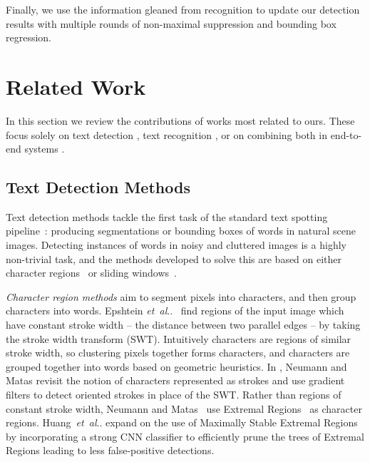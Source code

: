 \documentclass[twocolumn]{svjour3}          \smartqed  \usepackage{epsfig}
\makeatletter
\DeclareRobustCommand\onedot{\futurelet\@let@token\@onedot}
\def\@onedot{\ifx\@let@token.\else.\null\fi\xspace}
\def\etal{\emph{et~al}\onedot}
\makeatother
\begin{document}
Finally, we use the information gleaned from recognition to update our detection results with multiple rounds of non-maximal suppression and bounding box regression. 



\section{Related Work}
\label{sec:related}
In this section we review the contributions of works most related to ours. These focus solely on text detection \cite{Anthimopoulos11, Chen11a,Epshtein10,Yi11,Yin13,Huang14}, text recognition \cite{Mishra12,Novikova12,Rath07,Bissacco13,Jaderberg14c,Almazan14,Yao14}, or on combining both in end-to-end
systems \cite{QuackText09,Posner10,Wang12,NeumannText10, Neumann11,Neumann12,Wang11,Neumann13,Alsharif13,Weinman13,Jaderberg14a,Gordo14,Mishra13}.

\subsection{Text Detection Methods}
Text detection methods tackle the first task of the standard text spotting pipeline~\cite{Chen04text}: producing segmentations or bounding boxes of words in natural scene images. Detecting instances of words in noisy and cluttered images is a highly non-trivial task, and the methods developed to solve this are based on either character regions~\cite{Chen11a,Epshtein10,Yi11,Yin13,NeumannText10, Neumann11,Neumann12,Neumann13,Huang14} or sliding windows~\cite{Jaderberg14a,QuackText09,Anthimopoulos11,Posner10,Wang11,Wang12}.

\emph{Character region methods} aim to segment pixels into characters, and then group characters into words. Epshtein \etal~\cite{Epshtein10} find regions of the input image which have constant stroke width -- the distance between two parallel edges -- by taking the stroke width transform (SWT). Intuitively characters are regions of similar stroke width, so clustering pixels together forms characters, and characters are grouped together into words based on geometric heuristics. In \cite{Neumann13}, Neumann and Matas revisit the notion of characters represented as strokes and use gradient filters to detect oriented strokes in place of the SWT. Rather than regions of constant stroke width, Neumann and Matas~\citep{Neumann11,NeumannText10,Neumann12} use Extremal Regions~\cite{Matas02} as character regions. Huang~\etal \cite{Huang14} expand on the use of Maximally Stable Extremal Regions by incorporating a strong CNN classifier to efficiently prune the trees of Extremal Regions leading to less false-positive detections. 
\end{document}
